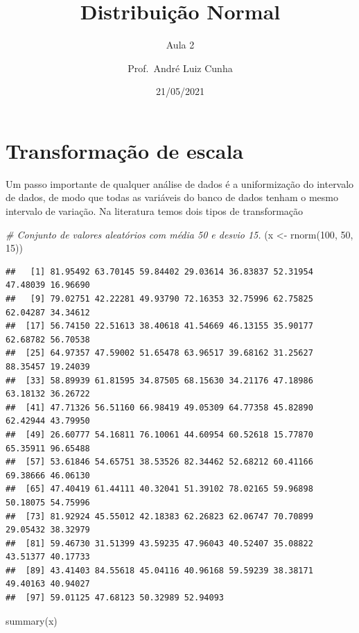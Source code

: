 \documentclass[
]{article}
\title{Distribuição Normal}
\subtitle{Aula 2}
\author{Prof.~André Luiz Cunha}
\date{21/05/2021}
\newenvironment{Shaded}{\begin{snugshade}}{\end{snugshade}}
\newcommand{\CommentTok}[1]{\textcolor[rgb]{0.56,0.35,0.01}{\textit{#1}}}
\newcommand{\DecValTok}[1]{\textcolor[rgb]{0.00,0.00,0.81}{#1}}
\newcommand{\FunctionTok}[1]{\textcolor[rgb]{0.00,0.00,0.00}{#1}}
\newcommand{\NormalTok}[1]{#1}
\newcommand{\OtherTok}[1]{\textcolor[rgb]{0.56,0.35,0.01}{#1}}
\begin{document}
\maketitle

\hypertarget{transformauxe7uxe3o-de-escala}{%
\section{Transformação de escala}\label{transformauxe7uxe3o-de-escala}}

Um passo importante de qualquer análise de dados é a uniformização do
intervalo de dados, de modo que todas as variáveis do banco de dados
tenham o mesmo intervalo de variação. Na literatura temos dois tipos de
transformação

\begin{Shaded}
\begin{Highlighting}[]
\CommentTok{\# Conjunto de valores aleatórios com média 50 e desvio 15.}
\NormalTok{(x }\OtherTok{\textless{}{-}} \FunctionTok{rnorm}\NormalTok{(}\DecValTok{100}\NormalTok{, }\DecValTok{50}\NormalTok{, }\DecValTok{15}\NormalTok{))}
\end{Highlighting}
\end{Shaded}

\begin{verbatim}
##   [1] 81.95492 63.70145 59.84402 29.03614 36.83837 52.31954 47.48039 16.96690
##   [9] 79.02751 42.22281 49.93790 72.16353 32.75996 62.75825 62.04287 34.34612
##  [17] 56.74150 22.51613 38.40618 41.54669 46.13155 35.90177 62.68782 56.70538
##  [25] 64.97357 47.59002 51.65478 63.96517 39.68162 31.25627 88.35457 19.24039
##  [33] 58.89939 61.81595 34.87505 68.15630 34.21176 47.18986 63.18132 36.26722
##  [41] 47.71326 56.51160 66.98419 49.05309 64.77358 45.82890 62.42944 43.79950
##  [49] 26.60777 54.16811 76.10061 44.60954 60.52618 15.77870 65.35911 96.65488
##  [57] 53.61846 54.65751 38.53526 82.34462 52.68212 60.41166 69.38666 46.06130
##  [65] 47.40419 61.44111 40.32041 51.39102 78.02165 59.96898 50.18075 54.75996
##  [73] 81.92924 45.55012 42.18383 62.26823 62.06747 70.70899 29.05432 38.32979
##  [81] 59.46730 31.51399 43.59235 47.96043 40.52407 35.08822 43.51377 40.17733
##  [89] 43.41403 84.55618 45.04116 40.96168 59.59239 38.38171 49.40163 40.94027
##  [97] 59.01125 47.68123 50.32989 52.94093
\end{verbatim}

\begin{Shaded}
\begin{Highlighting}[]
\FunctionTok{summary}\NormalTok{(x)}
\end{Highlighting}
\end{Shaded}
\end{document}
